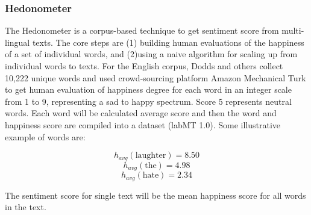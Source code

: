 \documentclass{article}
\begin{document}
\subsubsection{Hedonometer}
The Hedonometer \cite{dodds_temporal_2011} is a corpus-based technique to get sentiment score from multi-lingual texts. The core steps are (1) building human evaluations of the happiness of a set of individual words, and (2)using a naive algorithm for scaling up from individual words to texts. For the English corpus, Dodds and others \cite{dodds_temporal_2011} collect 10,222 unique words and used crowd-sourcing platform Amazon Mechanical Turk to get human evaluation of happiness degree for each word in an integer scale from 1 to 9, representing a sad to happy spectrum. Score 5 represents neutral words. Each word will be calculated average score and then the word and happiness score are compiled into a dataset (labMT 1.0). Some illustrative example of words are: 

\[h_{avg} (\text{laughter}) = 8.50 \]
\[h_{avg} (\text{the}) = 4.98\]
\[h_{avg} (\text{hate}) = 2.34\]

The sentiment score for single text will be the mean happiness score for all words in the text.


\printbibliography
\end{document}
